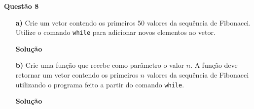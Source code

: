 \documentclass[12pt, a4paper]{article}
\begin{document}
\textbf{Questão 8}

\begin{itemize}
	\item[\textbf{a)}] Crie um vetor contendo os primeiros 50 valores da sequência de Fibonacci. Utilize o comando \texttt{while} para adicionar novos elementos ao vetor.
	
	
	
	\textbf{Solução}
	
	
	
	
	
	\item[\textbf{b)}] Crie uma função que recebe como parâmetro o valor $n$. A função deve retornar um vetor contendo os primeiros $n$ valores da sequência de Fibonacci utilizando o programa feito a partir do comando \texttt{while}.
	
	
	
	\textbf{Solução}
	
	
	
	
	
\end{itemize}




	
\end{document}
